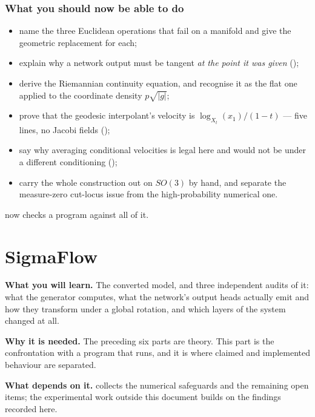 \documentclass[11pt,a4paper]{report}
\theoremstyle{definition}
\theoremstyle{remark}
\begin{document}
\section{What you should now be able to do}

\begin{itemize}[nosep]
\item name the three Euclidean operations that fail on a manifold and give the geometric replacement for each;
\item explain why a network output must be tangent \emph{at the point it was given} ();
\item derive the Riemannian continuity equation, and recognise it as the flat one applied to the coordinate density $p\sqrt{|g|}$;
\item prove that the geodesic interpolant's velocity is $\log_{X_t}(x_1)/(1-t)$ --- five lines, no Jacobi fields ();
\item say why averaging conditional velocities is legal here and would not be under a different conditioning ();
\item carry the whole construction out on $SO(3)$ by hand, and separate the measure-zero cut-locus issue from the high-probability numerical one.
\end{itemize}

 now checks a program against all of it.

\clearpage

\part{SigmaFlow}
\label{part:sigmaflow}


\begin{tcolorbox}[colback=gray!4,colframe=gray!55!black,
  title=Part VII at a glance, fonttitle=\bfseries, breakable]
\textbf{What you will learn.} The converted model, and three independent audits of it: what the generator computes, what the network's output heads actually emit and how they transform under a global rotation, and which layers of the system changed at all.

\textbf{Why it is needed.} The preceding six parts are theory. This part is the confrontation with a program that runs, and it is where claimed and implemented behaviour are separated.

\textbf{What depends on it.}  collects the numerical safeguards and the remaining open items; the experimental work outside this document builds on the findings recorded here.
\end{tcolorbox}
\end{document}
